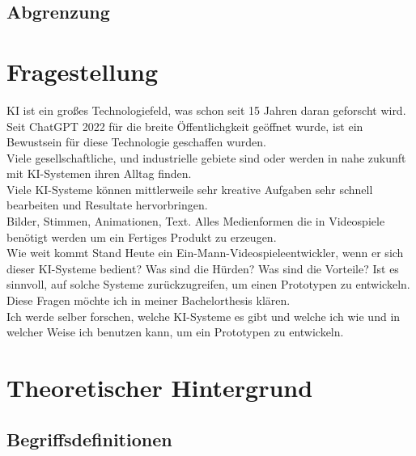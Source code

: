 \documentclass[10pt,a4paper,bibliography=totocnumbered,listof=totocnumbered]{scrartcl}
\begin{document}
\subsection{Abgrenzung}
\section{Fragestellung}
KI ist ein großes Technologiefeld, was schon seit 15 Jahren daran geforscht wird. Seit ChatGPT 2022 für die breite Öffentlichgkeit geöffnet wurde, ist ein Bewustsein für diese Technologie geschaffen wurden.
\\
Viele gesellschaftliche, und industrielle gebiete sind oder werden in nahe zukunft mit KI-Systemen ihren Alltag finden.
\\
Viele KI-Systeme können mittlerweile sehr kreative Aufgaben sehr schnell bearbeiten und Resultate hervorbringen.
\\
Bilder, Stimmen, Animationen, Text. Alles Medienformen die in Videospiele benötigt werden um ein Fertiges Produkt zu erzeugen.
\\
Wie weit kommt Stand Heute ein Ein-Mann-Videospieleentwickler, wenn er sich dieser KI-Systeme bedient? Was sind die Hürden? Was sind die Vorteile? Ist es sinnvoll, auf solche Systeme zurückzugreifen, um einen Prototypen zu entwickeln.
\\
Diese Fragen möchte ich in meiner Bachelorthesis klären.
\\
Ich werde selber forschen, welche KI-Systeme es gibt und welche ich wie und in welcher Weise ich benutzen kann, um ein Prototypen zu entwickeln.
 
\section{Theoretischer Hintergrund}
\subsection{Begriffsdefinitionen}%
\end{document}
